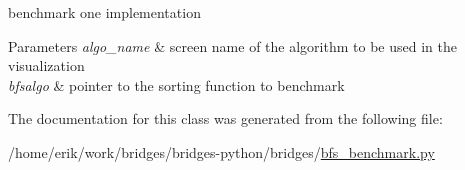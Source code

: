 benchmark one implementation 


\begin{DoxyParams}{Parameters}
{\em algo\+\_\+name} & screen name of the algorithm to be used in the visualization \\
\hline
{\em bfsalgo} & pointer to the sorting function to benchmark \\
\hline
\end{DoxyParams}


The documentation for this class was generated from the following file\+:\begin{DoxyCompactItemize}
\item 
/home/erik/work/bridges/bridges-\/python/bridges/\hyperlink{bfs__benchmark_8py}{bfs\+\_\+benchmark.\+py}\end{DoxyCompactItemize}
